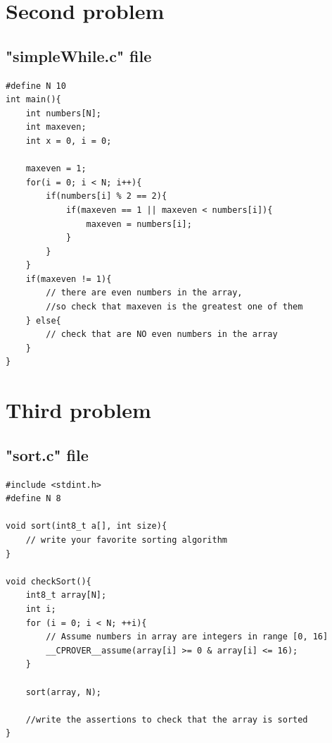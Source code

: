 \documentclass[a4paper,12pt]{article}
\begin{document}
\section{Second problem}
\subsection{"simpleWhile.c" file}

\begin{lstlisting}
#define N 10
int main(){
    int numbers[N];
    int maxeven;
    int x = 0, i = 0;
    
    maxeven = 1;
    for(i = 0; i < N; i++){
        if(numbers[i] % 2 == 2){
            if(maxeven == 1 || maxeven < numbers[i]){
                maxeven = numbers[i];
            }
        }
    }
    if(maxeven != 1){
        // there are even numbers in the array,
        //so check that maxeven is the greatest one of them
    } else{
        // check that are NO even numbers in the array
    }
}
\end{lstlisting}

\section{Third problem}
\subsection{"sort.c" file}

\begin{lstlisting}
#include <stdint.h>
#define N 8

void sort(int8_t a[], int size){
    // write your favorite sorting algorithm
}

void checkSort(){
    int8_t array[N];
    int i;
    for (i = 0; i < N; ++i){
        // Assume numbers in array are integers in range [0, 16]
        __CPROVER__assume(array[i] >= 0 & array[i] <= 16);
    }
    
    sort(array, N);
    
    //write the assertions to check that the array is sorted
}
\end{lstlisting}
\end{document}
